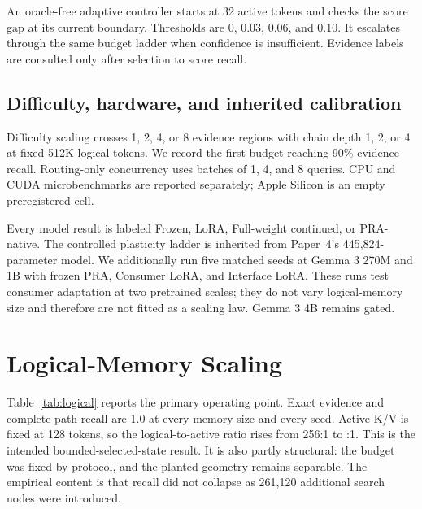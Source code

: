 \documentclass[10pt]{article}
\begin{document}
An oracle-free adaptive controller starts at 32 active tokens and checks the score
gap at its current boundary. Thresholds are 0, 0.03, 0.06, and 0.10. It escalates
through the same budget ladder when confidence is insufficient. Evidence labels
are consulted only after selection to score recall.

\subsection{Difficulty, hardware, and inherited calibration}

Difficulty scaling crosses 1, 2, 4, or 8 evidence regions with chain depth 1, 2,
or 4 at fixed 512K logical tokens. We record the first budget reaching 90\%
evidence recall. Routing-only concurrency uses batches of 1, 4, and 8 queries.
CPU and CUDA microbenchmarks are reported separately; Apple Silicon is an empty
preregistered cell.

Every model result is labeled Frozen, LoRA, Full-weight continued, or PRA-native.
The controlled plasticity ladder is inherited from Paper~4's
445,824-parameter model. We additionally run five matched seeds at Gemma 3 270M
and 1B with frozen PRA, Consumer LoRA, and Interface LoRA. These runs test
consumer adaptation at two pretrained scales; they do not vary logical-memory
size and therefore are not fitted as a scaling law. Gemma 3 4B remains gated.

\section{Logical-Memory Scaling}

Table~\ref{tab:logical} reports the primary operating point. Exact evidence and
complete-path recall are 1.0 at every memory size and every seed. Active K/V is
fixed at 128 tokens, so the logical-to-active ratio rises from 256:1 to
\PaperFiveLogicalRatio{}:1. This is the intended bounded-selected-state result.
It is also partly structural: the budget was fixed by protocol, and the planted
geometry remains separable. The empirical content is that recall did not collapse
as 261,120 additional search nodes were introduced.

\begin{table}[H]
\centering
\small
\caption{Fixed-difficulty scaling, averaged over five seeds. Indexed latency uses
four probes. ``Ratio'' is logical tokens divided by active native-K/V tokens.
Index MiB counts the float32 key matrix and centroids resident on the measured
device; it is not active attention state.}
\label{tab:logical}
\resizebox{\textwidth}{!}{}
\end{table}
\end{document}

